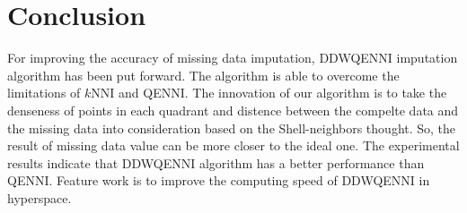 \documentclass[print]{jicspack}
\begin{document}
\section{Conclusion}
For improving the accuracy of missing data imputation, DDWQENNI imputation algorithm has been put forward. The algorithm is able to overcome the limitations of $k$NNI and QENNI. The innovation of our algorithm is to take the denseness of points in each quadrant and distence between the compelte data and the missing data into consideration based on the Shell-neighbors thought. So, the result of missing data value can be more closer to the ideal one. The experimental results indicate that DDWQENNI algorithm has a better performance than QENNI. Feature work is to improve the computing speed of DDWQENNI in hyperspace.

\begin{thebibliography}{00}\label{ref:ref}






\end{thebibliography}
\end{document}
